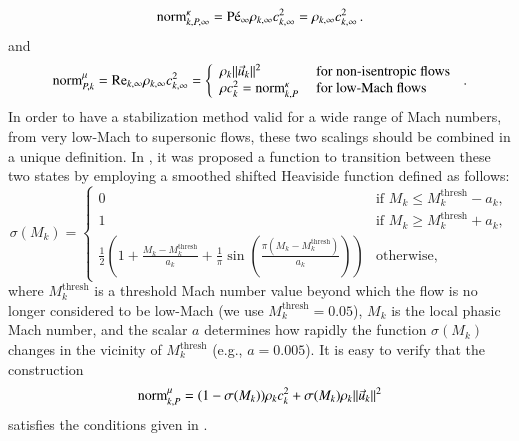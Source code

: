 \documentclass[preprint,10pt]{elsarticle}
\begin{document}
%
\begin{equation}
\label{eq:norm_relation_bis}
\textrm{norm}_{k,P,\infty}^{\kappa} = \textrm{P\'e}_\infty \rho_{k,\infty} c_{k,\infty}^2 = \rho_{k,\infty} c_{k,\infty}^2 \, .
\end{equation}
%
and
%
\begin{equation}
\label{eq:norm_ent2}
\textrm{norm}_{P,k}^\mu = \textrm{Re}_{k,\infty} \rho_{k,\infty} c_{k,\infty}^2 =  \left\{
\begin{array}{ll}
 \rho_k \|\vec{u}_k \|^2       & \text{ for non-isentropic flows} \\
 \rho c_k^2 = \textrm{norm}_{k,P}^\kappa & \text{ for low-Mach flows}
\end{array}
\right. \,.
\end{equation}
%
In order to have a stabilization method 
valid for a wide range of Mach numbers, from very low-Mach to supersonic flows, these two scalings should 
be combined in a unique definition. 
%
In \cite{Marco_paper_low_mach}, it was proposed a function to transition between these two states by employing a smoothed shifted Heaviside function
defined as follows: %
\begin{equation}
\sigma(M_k) =
\left\{
\begin{array}{ll}
0 & \text{if } M_k \le M_k^\text{thresh} - a_k, \\
1 & \text{if } M_k \ge M_k^\text{thresh} + a_k, \\
\tfrac{1}{2} \left( 1 + \tfrac{M_k-M_k^\text{thresh}}{a_k} + \tfrac{1}{\pi} \sin \left(\tfrac{\pi(M_k-M_k^\text{thresh})}{a_k}\right) \right) & \text{otherwise,}
\end{array}
\right.
\end{equation}
where $M_k^\text{thresh}$ is a threshold Mach number value beyond which the flow is no longer 
considered to be low-Mach (we use $M_k^\text{thresh}=0.05$), $M_k$ is the local phasic Mach number, 
and the scalar $a$ determines how rapidly the function $\sigma(M_k)$ changes in the vicinity of $M_k^\text{thresh}$ (e.g., $a = 0.005$). 
It is easy to verify that the construction
\begin{equation}
\label{eq:norm_ent3}
\textrm{norm}_{k,P}^\mu = (1-\sigma(M_k)) \rho_k c_k^2  + \sigma(M_k)  \rho_k \|\vec{u}_k \|^2  
\end{equation}
satisfies the conditions given in .
%
\end{document}
